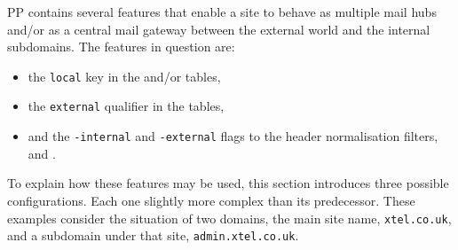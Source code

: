 PP contains several features that enable a site to behave as multiple
mail hubs and/or as a central mail gateway between the external world
and the internal subdomains.  The features in question are:
\begin{itemize}
\item the \verb+local+ key in the  and/or 
tables,
\item the \verb+external+ qualifier in the  tables,
\item and the \verb+-internal+ and \verb+-external+ flags to the
header normalisation filters,  and .
\end{itemize}

To explain how these features may be used, this section introduces
three possible configurations. Each one slightly more complex than its
predecessor.  These examples consider the situation of two domains,
the main site name, \verb+xtel.co.uk+, and a subdomain under that
site, \verb+admin.xtel.co.uk+.

